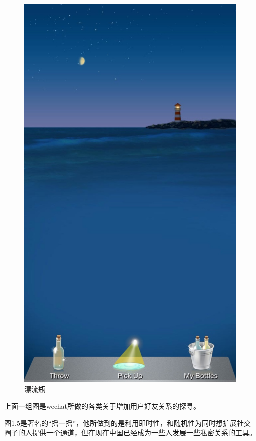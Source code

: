 \begin{figure}[h]
\begin{minipage}[t]{0.25\linewidth}
\includegraphics[width=\textwidth]{img/chap1/bottle.jpg}
\caption{漂流瓶\label{snapchat}}
\end{minipage}
\hfill
\end{figure}

上面一组图是wechat所做的各类关于增加用户好友关系的探寻。

图1.5是著名的“摇一摇”，他所做到的是利用即时性，和随机性为同时想扩展社交圈子的人提供一个通道，但在现在中国已经成为一些人发展一些私密关系的工具。

